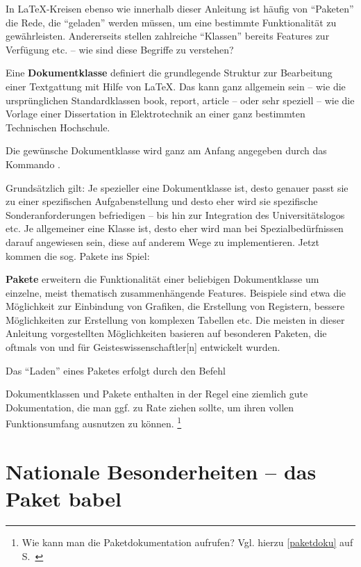 

In \LaTeX -Kreisen ebenso wie innerhalb dieser Anleitung ist häufig von \enquote{Paketen} die Rede,
die \enquote{geladen} werden müssen, um eine bestimmte Funktionalität zu gewährleisten.
Andererseits stellen zahlreiche \enquote{Klassen} bereits Features zur Verfügung etc. 
-- wie sind diese Begriffe zu verstehen?

Eine \textbf{Dokumentklasse} definiert die grundlegende Struktur zur Bearbeitung einer Textgattung
mit Hilfe von \LaTeX. Das kann ganz allgemein sein -- wie die ursprünglichen Standardklassen book, report, 
article -- oder sehr speziell -- wie die Vorlage einer Dissertation in Elektrotechnik an einer ganz
bestimmten Technischen Hochschule.

Die gewünsche Dokumentklasse wird ganz am Anfang angegeben durch das Kommando
.

Grundsätzlich gilt: Je spezieller eine Dokumentklasse ist, desto genauer passt sie zu einer spezifischen
Aufgabenstellung und desto eher wird sie spezifische Sonderanforderungen befriedigen -- bis hin zur
Integration des Universitätslogos etc.
Je allgemeiner eine Klasse ist, desto eher wird man bei Spezialbedürfnissen darauf angewiesen sein,
diese auf anderem Wege zu implementieren.
Jetzt kommen die sog. Pakete ins Spiel:

\textbf{Pakete} erweitern die Funktionalität einer beliebigen Dokumentklasse um einzelne, meist
thematisch zusammenhängende Features. Beispiele sind etwa die Möglichkeit zur Einbindung von
Grafiken, die Erstellung von Registern, bessere Möglichkeiten zur Erstellung von komplexen Tabellen etc.
Die meisten in dieser Anleitung vorgestellten Möglichkeiten basieren auf besonderen Paketen, die
oftmals von und für Geisteswissenschaftler[n] entwickelt wurden.

Das \enquote{Laden} eines Paketes erfolgt durch den Befehl 

Dokumentklassen und Pakete enthalten in der Regel eine ziemlich gute Dokumentation, die man
ggf. zu Rate ziehen sollte, um ihren vollen Funktionsumfang ausnutzen zu können.%
\footnote{Wie kann man die Paketdokumentation aufrufen? 
    Vgl. hierzu \ref{paketdoku} auf S.~\pageref{paketdoku} }


\section{Nationale Besonderheiten -- das Paket babel}
\label{babel}

